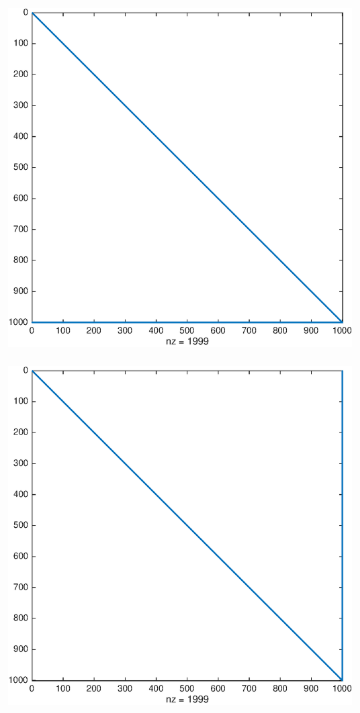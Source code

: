 \begin{enumerate}[label=\alph*)]
   \begin{figure}[h!]
     \begin{subfigure}[b]{0.5\linewidth}
       \centering
       \includegraphics[scale=0.4]{s4/matlab/tildeL} 
     \end{subfigure}
     \begin{subfigure}[b]{0.5\linewidth}
       \centering
       \includegraphics[scale=0.4]{s4/matlab/tildeU} 

\end{subfigure}
\end{figure}
\end{enumerate}
